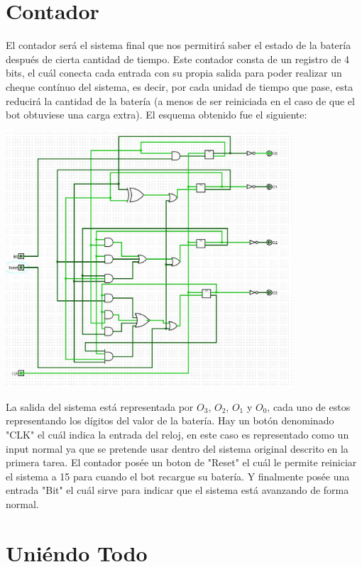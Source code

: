 \documentclass[a4paper]{article}
\begin{document}
\newpage

\section{Contador}

El contador será el sistema final que nos permitirá saber el estado de la batería después de cierta cantidad de tiempo. Este contador consta de
un registro de 4 bits, el cuál conecta cada entrada con su propia salida para poder realizar un cheque contínuo del sistema, es decir, por cada
unidad de tiempo que pase, esta reducirá la cantidad de la batería (a menos de ser reiniciada en el caso de que el bot obtuviese una carga extra).
El esquema obtenido fue el siguiente:

\begin{center}
	\includegraphics[width=0.8\textwidth]{tarea-2-ej-6.jpg}
\end{center}

La salida del sistema está representada por $O_{3}$, $O_{2}$, $O_{1}$ y $O_{0}$, cada uno de estos representando los dígitos del valor de la
batería. Hay un botón denominado "CLK" el cuál indica la entrada del reloj, en este caso es representado como un input normal ya que se pretende usar
dentro del sistema original descrito en la primera tarea. El contador posée un boton de "Reset" el cuál le permite reiniciar el sistema a 15 para 
cuando el bot recargue su batería. Y finalmente posée una entrada "Bit" el cuál sirve para indicar que el sistema está avanzando de forma normal.

\newpage

\section{Uniéndo Todo}
\end{document}
